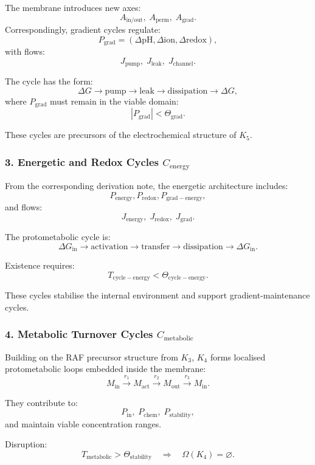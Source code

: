 The membrane introduces new axes:
\[
  A_{\mathrm{in/out}},\;
  A_{\mathrm{perm}},\;
  A_{\mathrm{grad}}.
\]
Correspondingly, gradient cycles regulate:
\[
  P_{\mathrm{grad}}=
    (\Delta \mathrm{pH}, \Delta \mathrm{ion}, \Delta \mathrm{redox}),
\]
with flows:
\[
  J_{\mathrm{pump}},\;
  J_{\mathrm{leak}},\;
  J_{\mathrm{channel}}.
\]

The cycle has the form:
\[
  \Delta G \to \mathrm{pump} \to
  \mathrm{leak} \to \mathrm{dissipation} \to
  \Delta G,
\]
where $P_{\mathrm{grad}}$ must remain in the viable domain:
\[
  |P_{\mathrm{grad}}| < \Theta_{\mathrm{grad}}.
\]

These cycles are precursors of the electrochemical structure of $K_5$.

\subsubsection{3. Energetic and Redox Cycles $C_{\mathrm{energy}}$}

From the corresponding derivation note, the energetic architecture includes:
\[
  P_{\mathrm{energy}},
  P_{\mathrm{redox}},
  P_{\mathrm{grad-energy}},
\]
and flows:
\[
  J_{\mathrm{energy}},\;
  J_{\mathrm{redox}},\;
  J_{\mathrm{grad}}.
\]

The protometabolic cycle is:
\[
  \Delta G_{\mathrm{in}} \to
  \mathrm{activation} \to
  \mathrm{transfer} \to
  \mathrm{dissipation} \to
  \Delta G_{\mathrm{in}}.
\]

Existence requires:
\[
  T_{\mathrm{cycle-energy}} < \Theta_{\mathrm{cycle-energy}}.
\]

These cycles stabilise the internal environment and support
gradient-maintenance cycles.

\subsubsection{4. Metabolic Turnover Cycles $C_{\mathrm{metabolic}}$}

Building on the RAF precursor structure from $K_3$, $K_4$ forms
localised protometabolic loops embedded inside the membrane:
\[
  M_{\mathrm{in}} \xrightarrow{r_1}
  M_{\mathrm{act}} \xrightarrow{r_2}
  M_{\mathrm{out}} \xrightarrow{r_3}
  M_{\mathrm{in}}.
\]

They contribute to:
\[
  P_{\mathrm{in}},\; P_{\mathrm{chem}},\; P_{\mathrm{stability}},
\]
and maintain viable concentration ranges.

Disruption:
\[
  T_{\mathrm{metabolic}}>\Theta_{\mathrm{stability}}
\quad\Rightarrow\quad
  \Omega(K_4)=\varnothing.
\]

